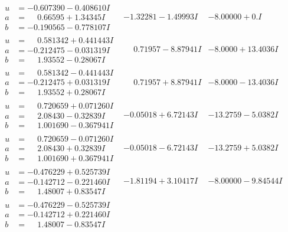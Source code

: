 \documentclass[1p]{elsarticle_modified}
\theoremstyle{definition}
\begin{document}
$$\begin{array}{c|c|c}
\begin{aligned}
u &= -0.607390 - 0.408610 I \\
a &= \phantom{-}0.66595 + 1.34345 I \\
b &= -0.190565 - 0.778107 I\end{aligned}
 & -1.32281 - 1.49993 I & -8.00000 + 0. I\phantom{ +0.000000I} \\ \hline\begin{aligned}
u &= \phantom{-}0.581342 + 0.441443 I \\
a &= -0.212475 - 0.031319 I \\
b &= \phantom{-}1.93552 - 0.28067 I\end{aligned}
 & \phantom{-}0.71957 - 8.87941 I & -8.0000 + 13.4036 I \\ \hline\begin{aligned}
u &= \phantom{-}0.581342 - 0.441443 I \\
a &= -0.212475 + 0.031319 I \\
b &= \phantom{-}1.93552 + 0.28067 I\end{aligned}
 & \phantom{-}0.71957 + 8.87941 I & -8.0000 - 13.4036 I \\ \hline\begin{aligned}
u &= \phantom{-}0.720659 + 0.071260 I \\
a &= \phantom{-}2.08430 - 0.32839 I \\
b &= \phantom{-}1.001690 - 0.367941 I\end{aligned}
 & -0.05018 + 6.72143 I & -13.2759 - 5.0382 I \\ \hline\begin{aligned}
u &= \phantom{-}0.720659 - 0.071260 I \\
a &= \phantom{-}2.08430 + 0.32839 I \\
b &= \phantom{-}1.001690 + 0.367941 I\end{aligned}
 & -0.05018 - 6.72143 I & -13.2759 + 5.0382 I \\ \hline\begin{aligned}
u &= -0.476229 + 0.525739 I \\
a &= -0.142712 - 0.221460 I \\
b &= \phantom{-}1.48007 + 0.83547 I\end{aligned}
 & -1.81194 + 3.10417 I & -8.00000 - 9.84544 I \\ \hline\begin{aligned}
u &= -0.476229 - 0.525739 I \\
a &= -0.142712 + 0.221460 I \\
b &= \phantom{-}1.48007 - 0.83547 I\end{aligned}

\end{array}$$
\end{document}
